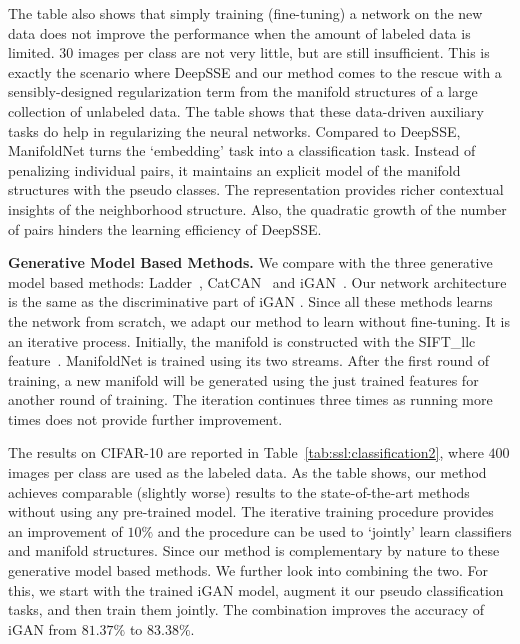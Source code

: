 \documentclass{bmvc2k}
\begin{document}
The table also shows that simply
training (fine-tuning) a network on the new data does not improve the
performance when the amount of labeled data is limited. $30$ images
per class are not very little, but are still insufficient. This is exactly the scenario where DeepSSE and our
method comes to the rescue with a sensibly-designed regularization term from
the manifold structures of a large collection of unlabeled data. The
table shows that these data-driven auxiliary tasks do help in
regularizing the neural networks. 
Compared to DeepSSE, ManifoldNet turns the `embedding' task into a classification
task. Instead of penalizing individual pairs, it maintains an
explicit model of the manifold structures with the pseudo
classes. The representation provides richer contextual insights of the
neighborhood structure. Also, the quadratic growth of the number of
pairs hinders the learning efficiency of DeepSSE. 


\noindent
\textbf{Generative Model Based Methods.} 
We compare with the three generative model based methods:  Ladder~\cite{ladder:network}, CatCAN~\cite{springenberg2015unsupervised} and iGAN~\cite{improved:GAN}. Our network architecture is the same as the discriminative part of iGAN \cite{improved:GAN}. Since all these methods learns the network from scratch, we adapt our method to learn without fine-tuning. It is an iterative process. Initially, the manifold is constructed with the SIFT\_llc feature~\cite{wang2010locality}. ManifoldNet is trained using its two streams. After the first round of training, a new manifold will be generated using the just trained features for another round of training. The iteration continues three times as running more times does not provide further improvement.   

The results on CIFAR-10 are reported in Table~\ref{tab:ssl:classification2}, where $400$ images per class are used as the labeled data. As the table shows, our method achieves comparable (slightly worse) results to the state-of-the-art methods without using any pre-trained model. The iterative training procedure provides an improvement of $10\%$ and the procedure can be used to `jointly' learn classifiers and manifold structures. Since our method is complementary by nature to these generative model based methods. We further look into combining the two. For this, we start with the trained iGAN model, augment it our pseudo classification tasks, and then train them jointly. The combination improves the accuracy of iGAN from $81.37\%$ to $83.38\%$.  
\end{document}
